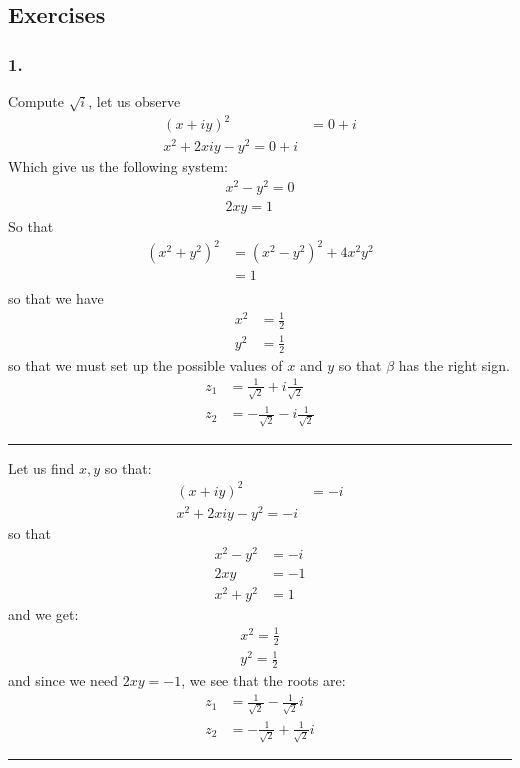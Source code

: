 \subsection{Exercises}
\subsubsection{1.}
Compute $\sqrt{i}$, let us observe
\begin{align*}
(x + iy)^2 &= 0 + i \\
x^2 + 2xiy - y^2 = 0 + i
\end{align*}
Which give us the following system:
\begin{align*}
x^2 - y^2 = 0 \\
2xy = 1
\end{align*}
So that 
\begin{align*}
(x^2 + y^2)^2 &= (x^2 - y^2)^2 + 4x^2y^2 \\
&= 1 \\
\end{align*}
so that we have
\begin{align*}
	x^2 &= \frac{1}{2} \\
	y^2 &= \frac{1}{2}
\end{align*}
so that we must set up the possible values of $x$ and $y$ so that $ \beta $ has the right sign.
\begin{align*}
z_1 &= \frac{1}{\sqrt{2}} + i\frac{1}{\sqrt{2}} \\
z_2 &= -\frac{1}{\sqrt{2}} - i\frac{1}{\sqrt{2}}
\end{align*}
\rule{\textwidth}{1pt}
Let us find $x,y$ so that:
\begin{align*}
(x + iy)^2 &= -i \\
x^2 + 2xiy - y^2 = -i
\end{align*}
so that
\begin{align*}
x^2 - y^2 &= -i \\
2xy &= -1 \\
x^2 + y^2 &= 1  
\end{align*}
and we get:
\begin{align*}
x^2 = \frac{1}{2} \\
y^2 = \frac{1}{2}
\end{align*}
and since we need $2xy = -1$, we see that the roots are:
\begin{align*}
z_1 &= \frac{1}{\sqrt{2}} - \frac{1}{\sqrt{2}}i \\
z_2 &= -\frac{1}{\sqrt{2}} + \frac{1}{\sqrt{2}}i
\end{align*}
\rule{\textwidth}{1pt}
